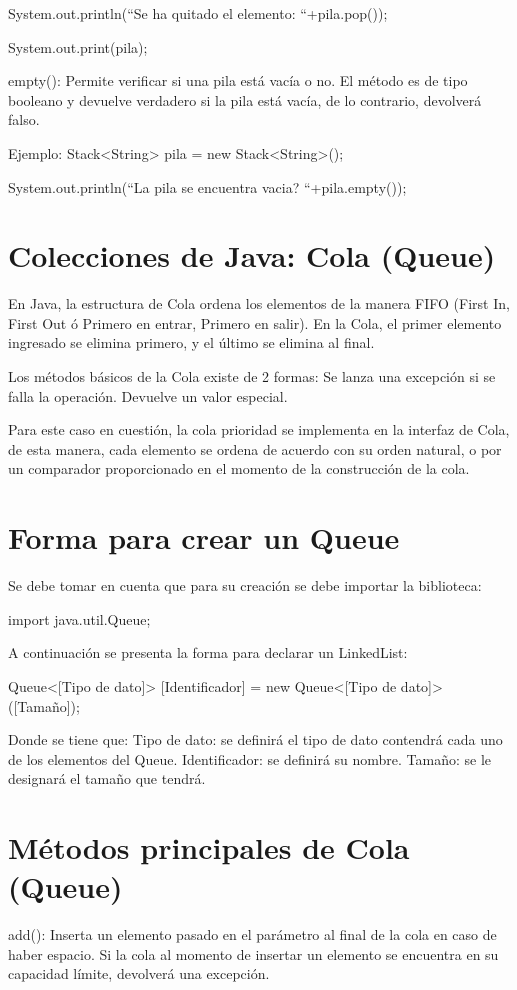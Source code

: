 \documentclass[12pt, letterpaper]{article} %
\begin{document}
System.out.println(“Se ha quitado el elemento: “+pila.pop());

System.out.print(pila);


empty():
Permite verificar si una pila está vacía o no. El método es de tipo booleano y devuelve verdadero si la pila está vacía, de lo contrario, devolverá falso.

Ejemplo:
Stack<String> pila = new Stack<String>();

System.out.println(“La pila se encuentra vacia? “+pila.empty());


\section{Colecciones de Java: Cola (Queue)}
En Java, la estructura de Cola ordena los elementos de la manera FIFO (First In, First Out ó Primero en entrar, Primero en salir). En la Cola, el primer elemento ingresado se elimina primero, y el último se elimina al final.

Los métodos básicos de la Cola existe de 2 formas:
Se lanza una excepción si se falla la operación.
Devuelve un valor especial.


Para este caso en cuestión, la cola prioridad se implementa en la interfaz de Cola, de esta manera, cada elemento se ordena de acuerdo con su orden natural, o por un comparador proporcionado en el momento de la construcción de la cola.

\section*{Forma para crear un Queue}
Se debe tomar en cuenta que para su creación se debe importar la biblioteca:

import java.util.Queue;

A continuación se presenta la forma para declarar un LinkedList:

Queue<[Tipo de dato]> [Identificador] = new Queue<[Tipo de dato]>([Tamaño]);

Donde se tiene que:
Tipo de dato: se definirá el tipo de dato contendrá cada uno de los elementos del Queue.
Identificador: se definirá su nombre.
Tamaño: se le designará el tamaño que tendrá.

\section*{Métodos principales de Cola (Queue)}
add():
Inserta un elemento pasado en el parámetro al final de la cola en caso de haber espacio. Si la cola al momento de insertar un elemento se encuentra en su capacidad límite, devolverá una excepción. 
\end{document}
